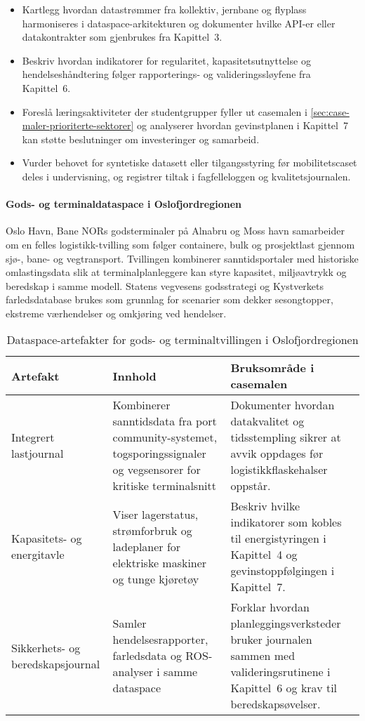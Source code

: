\begin{itemize}
    \item Kartlegg hvordan datastrømmer fra kollektiv, jernbane og flyplass harmoniseres i dataspace-arkitekturen og dokumenter hvilke API-er eller datakontrakter som gjenbrukes fra Kapittel~3.
    \item Beskriv hvordan indikatorer for regularitet, kapasitetsutnyttelse og hendelseshåndtering følger rapporterings- og valideringssløyfene fra Kapittel~6.
    \item Foreslå læringsaktiviteter der studentgrupper fyller ut casemalen i \autoref{sec:case-maler-prioriterte-sektorer} og analyserer hvordan gevinstplanen i Kapittel~7 kan støtte beslutninger om investeringer og samarbeid.
    \item Vurder behovet for syntetiske datasett eller tilgangsstyring før mobilitetscaset deles i undervisning, og registrer tiltak i fagfelleloggen og kvalitetsjournalen.
\end{itemize}

\paragraph{Gods- og terminaldataspace i Oslofjordregionen}
Oslo Havn, Bane NORs godsterminaler på Alnabru og Moss havn samarbeider om en felles logistikk-tvilling som følger containere, bulk og prosjektlast gjennom sjø-, bane- og vegtransport.\citep{oslohavn2024digitaltvilling,banenor2024godsnett} Tvillingen kombinerer sanntidsportaler med historiske omlastingsdata slik at terminalplanleggere kan styre kapasitet, miljøavtrykk og beredskap i samme modell. Statens vegvesens godsstrategi og Kystverkets farledsdatabase brukes som grunnlag for scenarier som dekker sesongtopper, ekstreme værhendelser og omkjøring ved hendelser.\citep{svv2023godsstrategi,kystverket2023farled}

\begin{table}[h]
    \centering
    \caption{Dataspace-artefakter for gods- og terminaltvillingen i Oslofjordregionen}
    \label{tab:oslofjord-gods}
    \begin{tabular}{p{3.5cm}p{4.6cm}p{4.8cm}}
        \toprule
        Artefakt & Innhold & Bruksområde i casemalen \\
        \midrule
        Integrert lastjournal & Kombinerer sanntidsdata fra port community-systemet, togsporingssignaler og vegsensorer for kritiske terminalsnitt & Dokumenter hvordan datakvalitet og tidsstempling sikrer at avvik oppdages før logistikkflaskehalser oppstår. \\
        Kapasitets- og energitavle & Viser lagerstatus, strømforbruk og ladeplaner for elektriske maskiner og tunge kjøretøy & Beskriv hvilke indikatorer som kobles til energistyringen i Kapittel~4 og gevinstoppfølgingen i Kapittel~7. \\
        Sikkerhets- og beredskapsjournal & Samler hendelsesrapporter, farledsdata og ROS-analyser i samme dataspace & Forklar hvordan planleggingsverksteder bruker journalen sammen med valideringsrutinene i Kapittel~6 og krav til beredskapsøvelser. \\
        \bottomrule
    \end{tabular}
\end{table}

